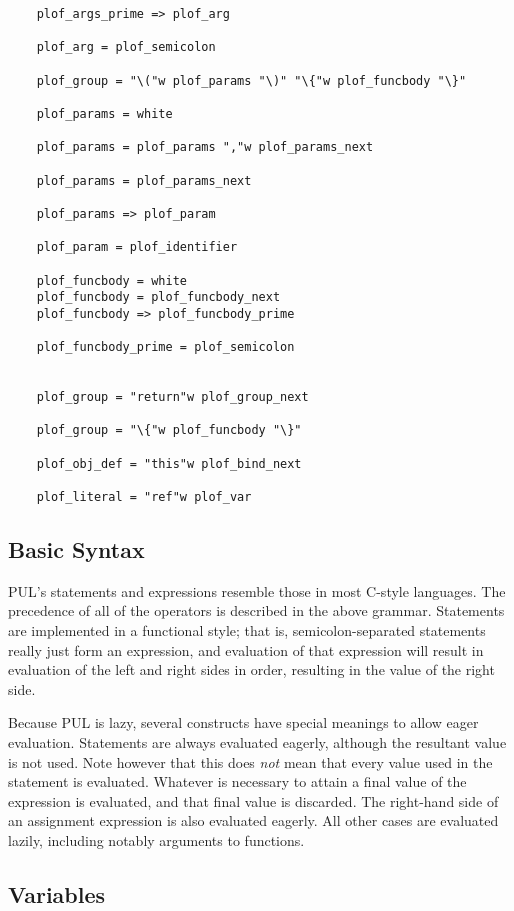 \begin{verbatim}
    plof_args_prime => plof_arg

    plof_arg = plof_semicolon

    plof_group = "\("w plof_params "\)" "\{"w plof_funcbody "\}"
    
    plof_params = white

    plof_params = plof_params ","w plof_params_next

    plof_params = plof_params_next

    plof_params => plof_param

    plof_param = plof_identifier

    plof_funcbody = white
    plof_funcbody = plof_funcbody_next
    plof_funcbody => plof_funcbody_prime

    plof_funcbody_prime = plof_semicolon


    plof_group = "return"w plof_group_next

    plof_group = "\{"w plof_funcbody "\}"

    plof_obj_def = "this"w plof_bind_next

    plof_literal = "ref"w plof_var
\end{verbatim}



\subsection{Basic Syntax}

PUL's statements and expressions resemble those in most C-style languages. The precedence of all of the operators is described in the above grammar. Statements are implemented in a functional style; that is, semicolon-separated statements really just form an expression, and evaluation of that expression will result in evaluation of the left and right sides in order, resulting in the value of the right side.

Because PUL is lazy, several constructs have special meanings to allow eager evaluation. Statements are always evaluated eagerly, although the resultant value is not used. Note however that this does \textit{not} mean that every value used in the statement is evaluated. Whatever is necessary to attain a final value of the expression is evaluated, and that final value is discarded. The right-hand side of an assignment expression is also evaluated eagerly. All other cases are evaluated lazily, including notably arguments to functions.



\subsection{Variables}

